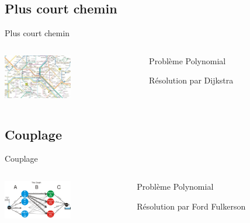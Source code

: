 \documentclass{beamer}
\begin{document}
	\subsection{Plus court chemin}
		\begin{frame}{Plus court chemin}
        \begin{columns}
            \begin{column}{0cm}
                \includegraphics[width=3cm]{images/metro.jpg}
            \end{column}
            \begin{column}{8cm}
                \begin{description}\itemsep15pt
                    \item Problème Polynomial
                    \item Résolution par Dijkstra
                \end{description}
            \end{column}
        \end{columns}
		\end{frame}
	\subsection{Couplage}
		\begin{frame}{Couplage}
           \begin{columns}
            \begin{column}{0cm}
                \includegraphics[width=3cm]{images/exemple_couplage.png}
            \end{column}
            \begin{column}{8cm}
                \begin{description}\itemsep15pt
                    \item Problème Polynomial
                    \item Résolution par Ford Fulkerson
                \end{description}
            \end{column}
        \end{columns}
		\end{frame}
\end{document}
